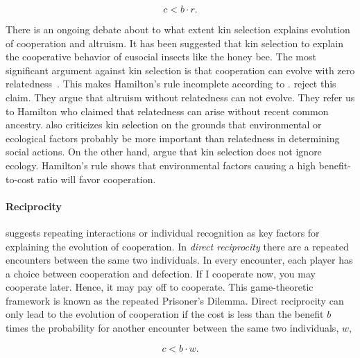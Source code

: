 \documentclass[12pt]{extarticle}
\begin{document}
\begin{equation} \label{eq:hamilton_rule}
c < b \cdot r.
\end{equation}

There is an ongoing debate about to what extent kin selection explains evolution of cooperation and altruism.
It has been suggested that kin selection to explain the cooperative behavior of eusocial insects like the honey bee.
The most significant argument against kin selection is that cooperation can evolve with zero relatedness~\citep{wilson2005kin}. This makes Hamilton's rule incomplete according to \citet{wilson2005kin}. \citet{foster2006kin} reject this claim. They argue that altruism without relatedness can not evolve. They refer us to Hamilton who claimed that relatedness can arise without recent common ancestry. 
\citet{wilson2005kin} also criticizes kin selection on the grounds that environmental or ecological factors probably be more important than relatedness in determining social actions. On the other hand, \citet{foster2006kin} argue that kin selection does not ignore ecology. Hamilton's rule shows
that environmental factors causing a high benefit-to-cost ratio will favor cooperation.

\paragraph{Reciprocity} suggests repeating interactions or individual recognition as key factors for explaining the evolution of cooperation. In \emph{direct reciprocity} there are a repeated encounters between the same two individuals. In every encounter, each player has a choice between cooperation and defection. If I cooperate now, you may cooperate later. Hence, it may pay off to cooperate.
This game-theoretic framework is known as the repeated Prisoner's Dilemma. 
Direct reciprocity can only lead to the evolution of cooperation if the cost is less than the benefit $b$ times the probability for another encounter between the same two individuals, $w$, 

\begin{equation} \label{eq:reciprocity}
c < b \cdot w.
\end{equation}
\end{document}
